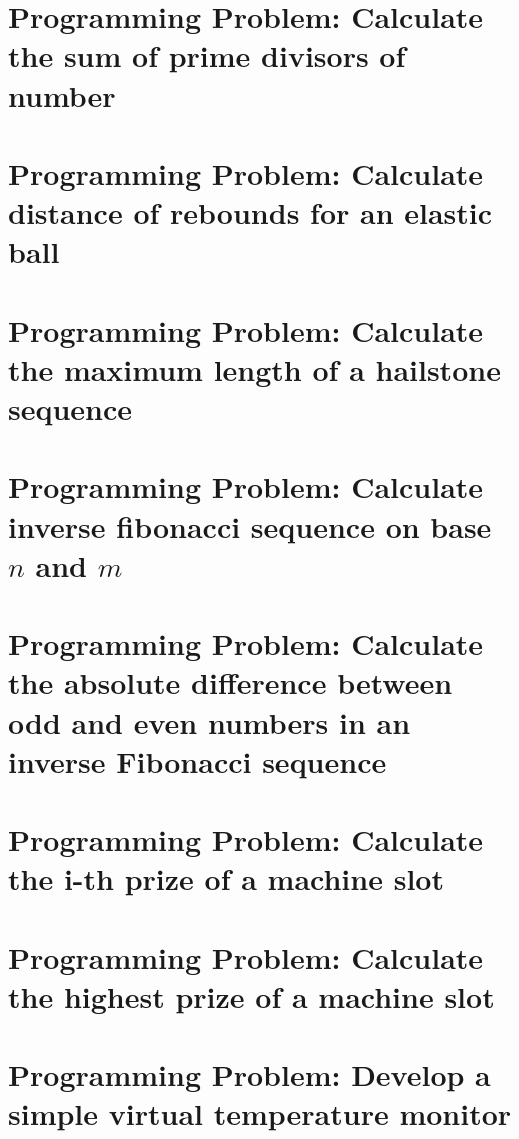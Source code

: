 \newpage
\section{Programming Problem: Calculate the sum of prime divisors of number}
\label{annex:pilot-study-p2}

\newpage
\section{Programming Problem: Calculate distance of rebounds for an elastic ball}
\label{annex:pilot-study-p3}

\newpage
\section{Programming Problem: Calculate the maximum length of a hailstone sequence}
\label{annex:pilot-study-p4}

\newpage
\section{Programming Problem: Calculate inverse fibonacci sequence on base $n$ and $m$}
\label{annex:pilot-study-pA}

\newpage
\section{Programming Problem: Calculate the absolute difference between odd and even numbers in an inverse Fibonacci sequence}
\label{annex:pilot-study-pB}

\newpage
\section{Programming Problem: Calculate the i-th prize of a machine slot}
\label{annex:pilot-study-pC}

\newpage
\section{Programming Problem: Calculate the highest prize of a machine slot}
\label{annex:pilot-study-pD}

\newpage
\section{Programming Problem: Develop a simple virtual temperature monitor}
\label{annex:first-study-p1}

\newpage
